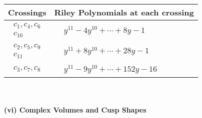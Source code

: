 \documentclass[1p]{elsarticle_modified}
\theoremstyle{definition}
\begin{document}
\begin{tabular}{m{50pt}|m{274pt}}
Crossings & \hspace{64pt}Riley Polynomials at each crossing \\
\hline $$\begin{aligned}c_{1},c_{4},c_{6}\\c_{10}\end{aligned}$$&$\begin{aligned}
&y^{11}-4 y^{10}+\cdots+8 y-1
\end{aligned}$\\
\hline $$\begin{aligned}c_{2},c_{5},c_{9}\\c_{11}\end{aligned}$$&$\begin{aligned}
&y^{11}+8 y^{10}+\cdots+28 y-1
\end{aligned}$\\
\hline $$\begin{aligned}c_{3},c_{7},c_{8}\end{aligned}$$&$\begin{aligned}
&y^{11}-9 y^{10}+\cdots+152 y-16
\end{aligned}$\\
\hline
\end{tabular}\\~\\
\newpage\flushleft \textbf{(vi) Complex Volumes and Cusp Shapes}
\end{document}
